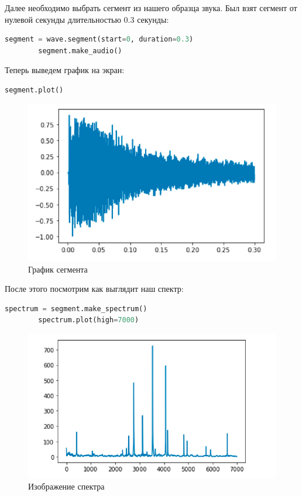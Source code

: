 \documentclass[a4]{article}
\begin{document}
    Далее необходимо выбрать сегмент из нашего образца звука.
    Был взят сегмент от нулевой секунды длительностью 0.3 секунды:

    \begin{lstlisting}[language=Python, caption= Выбор сегмента, label={lst:segment_choose}]
        segment = wave.segment(start=0, duration=0.3)
        segment.make_audio()
    \end{lstlisting}

    Теперь выведем график на экран:

    \begin{lstlisting}[language=Python, caption= Вывод графика, label={lst:segment_plot}]
        segment.plot()
    \end{lstlisting}

    \begin{figure}[H]
        \centering
        \includegraphics[width=\textwidth]{segment_plot}
        \caption{График сегмента}
        \label{fig:plot_segment_1}
    \end{figure}

    После этого посмотрим как выглядит наш спектр:

    \begin{lstlisting}[language=Python, caption= Изображение спектра, label={lst:spectr_segment}]
        spectrum = segment.make_spectrum()
        spectrum.plot(high=7000)
    \end{lstlisting}

    \begin{figure}[H]
        \centering
        \includegraphics[width=\textwidth]{segment_spectr}
        \caption{Изображение спектра}
        \label{fig:segment_spectr}
    \end{figure}
\end{document}
